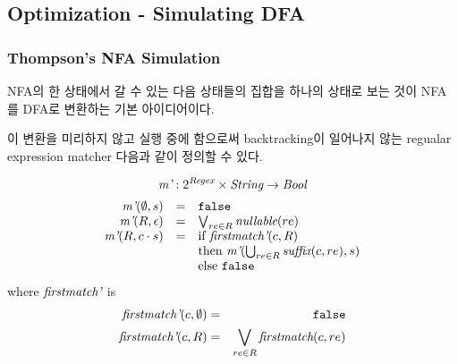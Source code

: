 \subsection{Optimization - Simulating DFA}

\begin{frame}[shrink]
\frametitle{Thompson's NFA Simulation}

NFA의 한 상태에서 갈 수 있는 다음 상태들의 집합을 하나의 상태로 보는 것이
NFA를 DFA로 변환하는 기본 아이디어이다.

이 변환을 미리하지 않고 실행 중에 함으로써 backtracking이 일어나지 않는
regualar expression matcher  다음과 같이 정의할 수 있다.

    \[
        \MM  :  2^{\mbit{Regex}} \times \mbit{String} \ra \mbit{Bool}
    \]
\[
  \begin{array}{rcl}
    \rsmatch{s}{\emptyset} & = & \mtt{false} \\
    \rsmatch{\e}{R} & = & \bigvee_{re\in R}\nullable(re) \\
    \rsmatch{\cs}{R} & = & \mrm{if }\Firstmatch(c,R) \\
                     &   & \mrm{then }\rsmatch{s}{\bigcup_{re\in R}\suffix(c,re)} \\
                     &   & \mrm{else }{\F} 
  \end{array}
\]  
where $\Firstmatch$ is
  \begin{eqnarray}
    \Firstmatch(c,\emptyset) & = & \F \nonumber \\
    \Firstmatch(c, R) & = & \bigvee_{re\in R}\firstmatch(c,re) \nonumber
  \end{eqnarray}

\end{frame}
